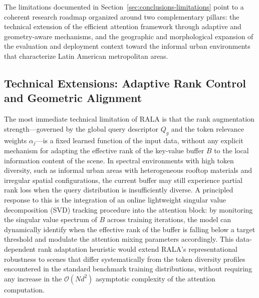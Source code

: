The limitations documented in Section~\ref{sec:conclusions-limitations} point
to a coherent research roadmap organized around two complementary pillars: the
technical extension of the efficient attention framework through adaptive and
geometry-aware mechanisms, and the geographic and morphological expansion of the
evaluation and deployment context toward the informal urban environments that
characterize Latin American metropolitan areas.

\subsection*{Technical Extensions: Adaptive Rank Control and Geometric Alignment}

The most immediate technical limitation of RALA is that the rank augmentation
strength---governed by the global query descriptor $Q_g$ and the token relevance
weights $\alpha_j$---is a fixed learned function of the input data, without any
explicit mechanism for adapting the effective rank of the key-value buffer $B$
to the local information content of the scene. In spectral environments with
high token diversity, such as informal urban areas with heterogeneous rooftop
materials and irregular spatial configurations, the current buffer may still
experience partial rank loss when the query distribution is insufficiently
diverse. A principled response to this is the integration of an online
lightweight singular value decomposition (SVD) tracking procedure into the
attention block: by monitoring the singular value spectrum of $B$ across training
iterations, the model can dynamically identify when the effective rank of the
buffer is falling below a target threshold and modulate the attention mixing
parameters accordingly. This data-dependent rank adaptation heuristic would
extend RALA's representational robustness to scenes that differ systematically
from the token diversity profiles encountered in the standard benchmark training
distributions, without requiring any increase in the $\mathcal{O}(N d^2)$
asymptotic complexity of the attention computation.

